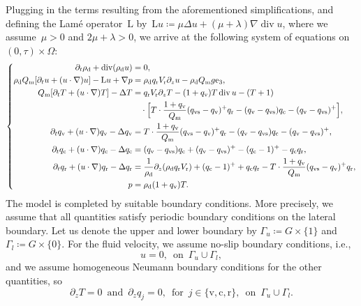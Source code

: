 \documentclass[10pt]{amsart}
\theoremstyle{plain}
\theoremstyle{definition}
\theoremstyle{thm}
\numberwithin{equation}{section}
\newcommand{\rL}{\mathrm{L}}
\DeclareMathOperator{\mdiv}{div}
\newcommand{\mre}{\mathrm{e}}
\newcommand{\del}{\partial}
\newcommand{\Gal}{\Gamma_l}
\newcommand{\Gau}{\Gamma_u}
\newcommand{\tand}{\enspace \text{and} \enspace}
\newcommand{\ton}{\enspace \text{on} \enspace}
\newcommand{\tfor}{\enspace \text{for} \enspace}
\newcommand{\rd}{\mathrm{d}}
\renewcommand{\rm}{\mathrm{m}}
\newcommand{\rr}{\mathrm{r}}
\newcommand{\rv}{\mathrm{v}}
\newcommand{\rvs}{\mathrm{vs}}
\newcommand{\rc}{\mathrm{c}}
\begin{document}
Plugging in the terms resulting from the aforementioned simplifications, and defining the Lam\'e operator~$\rL$ by~$\rL u \coloneqq \mu\Delta u +(\mu+\lambda)\nabla\mdiv u$, where we assume~$\mu > 0$ and $2\mu + \lambda > 0$, we arrive at the following system of equations on~$(0,\tau) \times \Omega$:
\begin{equation}\label{eq:coupled moisture compr NSE detailed}
    \left\{
    \begin{aligned}
        \del_t \rho_{\rd} + \mdiv(\rho_\rd u)
        &=0,\\
        \rho_{\rd}Q_{\rm}[\del_t u + (u \cdot \nabla)u]-\rL u+\nabla p
        &=\rho_{\rd}q_{\rr}V_{\rr}\partial_{z}u -\rho_{\rd}Q_{\rm}g \mre_{3},\\
        Q_{\rm}[\del_t T + (u \cdot \nabla)T]-\Delta T
        &=q_{\rr}V_{\rr}\partial_{z}T-(1+q_{\rv})T \mdiv u-(T+1)\\
        &\quad \cdot \Bigl[T \cdot \frac{1 + q_\rv}{Q_\rm}(q_\rvs - q_\rv)^+ q_\rr- (q_\rv - q_\rvs) q_\rc - (q_\rv - q_\rvs)^+\Bigr],\\
        \del_t q_{\rv} + (u \cdot \nabla) q_{\rv}-\Delta q_{\rv} 
        &=T \cdot \frac{1 + q_\rv}{Q_\rm}(q_\rvs - q_\rv)^+ q_\rr- (q_\rv - q_\rvs) q_\rc - (q_\rv - q_\rvs)^+,\\
        \del_t q_{\rc} + (u \cdot \nabla) q_{\rc}-\Delta q_{\rc}
        &= (q_\rv - q_\rvs) q_\rc + (q_\rv - q_\rvs)^+ - (q_\rc - 1)^+ - q_\rc q_\rr ,\\
        \del_t q_{\rr} + (u \cdot \nabla) q_{\rr}-\Delta q_{\rr}
        &= \frac{1}{\rho_{\rd}}\partial_{z}(\rho_{\rd} q_{\rr}V_{\rr}) + (q_{\rc}-1)^{+}+q_{\rc}q_{\rr} - T \cdot \frac{1 + q_\rv}{Q_\rm}(q_\rvs - q_\rv)^+ q_\rr,\\
		p
        &=\rho_{\rd}(1+q_{\rv}) T.
    \end{aligned}
    \right.
\end{equation}
The model is completed by suitable boundary conditions.
More precisely, we assume that all quantities satisfy periodic boundary conditions on the lateral boundary.
Let us denote the upper and lower boundary by $\Gau \coloneqq G \times \{1\}$ and $\Gal \coloneqq G \times \{0\}$. For the fluid velocity, we assume no-slip boundary conditions, i.e.,
\begin{equation}\label{eq:bc fluid}
    u = 0, \ton \Gau \cup \Gal,
\end{equation}
and we assume homogeneous Neumann boundary conditions for the other quantities, so
\begin{equation}\label{eq:bc heat & moisture}
    \del_z T = 0 \tand \del_z q_j = 0, \tfor j \in \{\rv,\rc,\rr\}, \ton \Gau \cup \Gal.
\end{equation}
\end{document}
